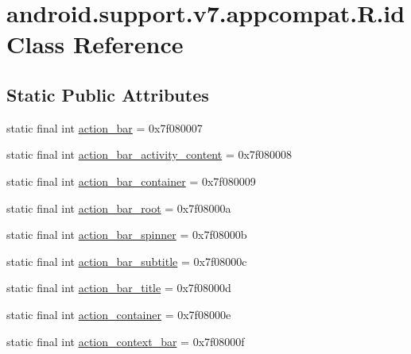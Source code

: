 \hypertarget{classandroid_1_1support_1_1v7_1_1appcompat_1_1_r_1_1id}{}\section{android.\+support.\+v7.\+appcompat.\+R.\+id Class Reference}
\label{classandroid_1_1support_1_1v7_1_1appcompat_1_1_r_1_1id}
\subsection*{Static Public Attributes}
\begin{DoxyCompactItemize}
\item 
static final int \mbox{\hyperlink{classandroid_1_1support_1_1v7_1_1appcompat_1_1_r_1_1id_a6c9c8b18c3b57617cf60a9b1ad51f2f1}{action\+\_\+bar}} = 0x7f080007
\item 
static final int \mbox{\hyperlink{classandroid_1_1support_1_1v7_1_1appcompat_1_1_r_1_1id_a9ed5ea10a253071eaefa58062f541097}{action\+\_\+bar\+\_\+activity\+\_\+content}} = 0x7f080008
\item 
static final int \mbox{\hyperlink{classandroid_1_1support_1_1v7_1_1appcompat_1_1_r_1_1id_a4e19d90e373b2bdb18641e8820c0d7a3}{action\+\_\+bar\+\_\+container}} = 0x7f080009
\item 
static final int \mbox{\hyperlink{classandroid_1_1support_1_1v7_1_1appcompat_1_1_r_1_1id_afbd1bfdb4a6c3f4fe61c7d6f8d0b6f45}{action\+\_\+bar\+\_\+root}} = 0x7f08000a
\item 
static final int \mbox{\hyperlink{classandroid_1_1support_1_1v7_1_1appcompat_1_1_r_1_1id_ae703f67eed43afe20bafdd104fc16078}{action\+\_\+bar\+\_\+spinner}} = 0x7f08000b
\item 
static final int \mbox{\hyperlink{classandroid_1_1support_1_1v7_1_1appcompat_1_1_r_1_1id_ac071fd37a9fcb4d4f8f4179f7d722e40}{action\+\_\+bar\+\_\+subtitle}} = 0x7f08000c
\item 
static final int \mbox{\hyperlink{classandroid_1_1support_1_1v7_1_1appcompat_1_1_r_1_1id_a30bf2ad178d05c2a1633b54e55ed8e8a}{action\+\_\+bar\+\_\+title}} = 0x7f08000d
\item 
static final int \mbox{\hyperlink{classandroid_1_1support_1_1v7_1_1appcompat_1_1_r_1_1id_a9aeff32bca1e4d867b950a4aca00f344}{action\+\_\+container}} = 0x7f08000e
\item 
static final int \mbox{\hyperlink{classandroid_1_1support_1_1v7_1_1appcompat_1_1_r_1_1id_ad1965908d64ef4efb15b3160636a5ed8}{action\+\_\+context\+\_\+bar}} = 0x7f08000f

\end{DoxyCompactItemize}
